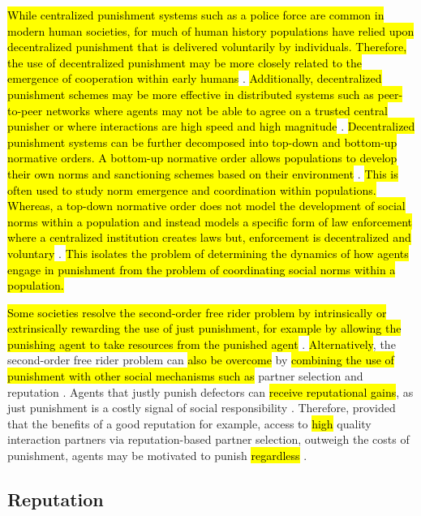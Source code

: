 \documentclass[sn-aps,numbered]{sn-jnl}%
\theoremstyle{thmstyleone}%
\theoremstyle{thmstyletwo}%
\theoremstyle{thmstylethree}%
\begin{document}
\hl{While centralized punishment systems such as a police force are common in modern human societies, for much of human history populations have relied upon decentralized punishment that is delivered voluntarily by individuals. Therefore, the use of decentralized punishment may be more closely related to the emergence of cooperation within early humans} \cite{silly_rules_ssd}. \hl{Additionally, decentralized punishment schemes may be more effective in distributed systems such as peer-to-peer networks where agents may not be able to agree on a trusted central punisher or where interactions are high speed and high magnitude} \citep{resource_constraint_punish}. \hl{Decentralized punishment systems can be further decomposed into top-down and bottom-up normative orders. A bottom-up normative order allows populations to develop their own norms and sanctioning schemes based on their environment} \citep{learning_social_norms_punish, coop_reputation_mirco, brooks2011modeling}. \hl{This is often used to study norm emergence and coordination within populations. Whereas, a top-down normative order does not model the development of social norms within a population and instead models a specific form of law enforcement where a centralized institution creates laws but, enforcement is decentralized and voluntary} \citep{silly_rules_ssd, division_of_labour, learning_to_penalise_other_agents}. \hl{This isolates the problem of determining the dynamics of how agents engage in punishment from the problem of coordinating social norms within a population.}

\hl{Some societies resolve the second-order free rider problem by intrinsically or extrinsically rewarding the use of just punishment, for example by allowing the punishing agent to take resources from the punished agent} \citep{silly_rules_ssd}. \hl{Alternatively}, the second-order free rider problem can \hl{also be overcome} by \hl{combining the use of punishment with other social mechanisms such as} partner selection and reputation \citep{Redhead2021, boyd1992punishment}. Agents that justly punish defectors can \hl{receive reputational gains}, as just punishment is a costly signal of social responsibility \citep{Dreber2008}. Therefore, provided that the benefits of a good reputation for example, access to \hl{high} quality interaction partners via reputation-based partner selection, outweigh the costs of punishment, agents may be motivated to punish \hl{regardless} \citep{Redhead2021}.

\subsection{Reputation}
 
\end{document}
